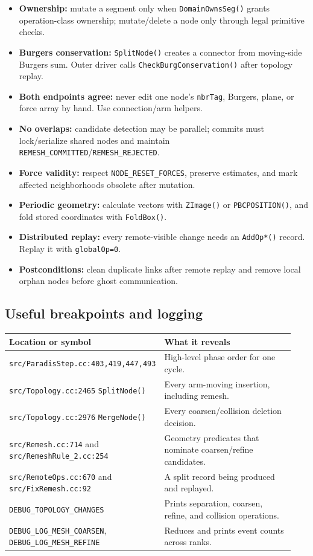 \documentclass[11pt]{article}
\newcommand{\code}[1]{\texorpdfstring{\nolinkurl{#1}}{#1}}
\begin{document}
\begin{itemize}
\item \textbf{Ownership:} mutate a segment only when \code{DomainOwnsSeg()}
grants operation-class ownership; mutate/delete a node only through legal
primitive checks.
\item \textbf{Burgers conservation:} \code{SplitNode()} creates a connector
from moving-side Burgers sum. Outer driver calls
\code{CheckBurgConservation()} after topology replay.
\item \textbf{Both endpoints agree:} never edit one node's \code{nbrTag},
Burgers, plane, or force array by hand. Use connection/arm helpers.
\item \textbf{No overlaps:} candidate detection may be parallel; commits must
lock/serialize shared nodes and maintain
\code{REMESH_COMMITTED}/\code{REMESH_REJECTED}.
\item \textbf{Force validity:} respect \code{NODE_RESET_FORCES}, preserve
estimates, and mark affected neighborhoods obsolete after mutation.
\item \textbf{Periodic geometry:} calculate vectors with \code{ZImage()} or
\code{PBCPOSITION()}, and fold stored coordinates with \code{FoldBox()}.
\item \textbf{Distributed replay:} every remote-visible change needs an
\code{AddOp*()} record. Replay it with \code{globalOp=0}.
\item \textbf{Postconditions:} clean duplicate links after remote replay and
remove local orphan nodes before ghost communication.
\end{itemize}

\subsection{Useful breakpoints and logging}

{\small
\begin{longtable}{@{}p{0.38\linewidth}p{0.56\linewidth}@{}}
\toprule
Location or symbol & What it reveals \\
\midrule
\endhead
\code{src/ParadisStep.cc:403,419,447,493} & High-level phase order for one cycle. \\
\code{src/Topology.cc:2465} \code{SplitNode()} & Every arm-moving insertion, including remesh. \\
\code{src/Topology.cc:2976} \code{MergeNode()} & Every coarsen/collision deletion decision. \\
\code{src/Remesh.cc:714} and \code{src/RemeshRule_2.cc:254} & Geometry predicates that nominate coarsen/refine candidates. \\
\code{src/RemoteOps.cc:670} and \code{src/FixRemesh.cc:92} & A split record being produced and replayed. \\
\code{DEBUG_TOPOLOGY_CHANGES} & Prints separation, coarsen, refine, and collision operations. \\
\code{DEBUG_LOG_MESH_COARSEN}, \code{DEBUG_LOG_MESH_REFINE} & Reduces and prints event counts across ranks. \\
\end{longtable}
}
\end{document}
